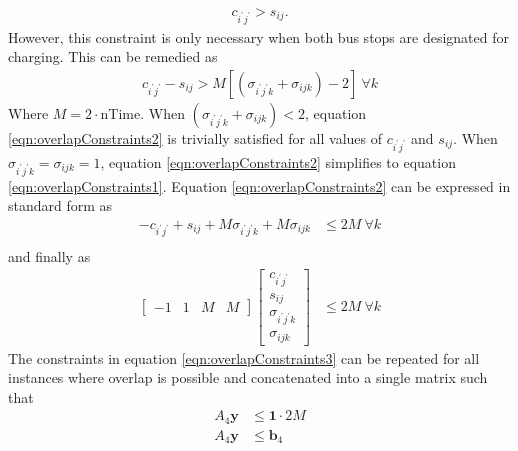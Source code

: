 \begin{align}\label{eqn:overlapConstraints1}
c_{i^{'}j^{'}} > s_{ij}.
\end{align}
However, this constraint is only necessary when both bus stops are designated for charging. This can be remedied as
	\begin{align}\label{eqn:overlapConstraints2}
		c_{i^{'}j^{'}} - s_{ij} > M\left[(\sigma_{i^{'}j^{'}k} + \sigma_{ijk}) - 2\right] \ \forall k
	\end{align}
	Where $M = 2\cdot\text{nTime}$. When $(\sigma_{i^{'}j^{'}k} + \sigma_{ijk}) < 2$, equation \ref{eqn:overlapConstraints2} is trivially satisfied for all values of $c_{i^{'}j^{'}}$ and $s_{ij}$. When $\sigma_{i^{'}j^{'}k} = \sigma_{ijk} = 1$, equation \ref{eqn:overlapConstraints2} simplifies to equation \ref{eqn:overlapConstraints1}. Equation \ref{eqn:overlapConstraints2} can be expressed in standard form as 
	\begin{equation}\label{eqn:overlapConstraints3}\begin{aligned}
		-c_{i^{'}j^{'}} + s_{ij} + M\sigma_{i^{'}j^{'}k} + M\sigma_{ijk} &\le 2M  \ \forall k\\
	\end{aligned}\end{equation}
	and finally as
	\begin{equation}\begin{aligned} 
		\begin{bmatrix} -1 & 1 & M & M\end{bmatrix} \begin{bmatrix}c_{i^{'}j^{'}}\\ s_{ij} \\ \sigma_{i^{'}j^{'}k}\\ \sigma_{ijk} \end{bmatrix} &\le 2M \ \forall k
	\end{aligned} \end{equation}
	The constraints in equation \ref{eqn:overlapConstraints3} can be repeated for all instances where overlap is possible and concatenated into a single matrix such that
	\begin{equation}\begin{aligned} 
		A_4\mathbf{y} & \le \mathbf{1}\cdot 2M \\
		A_4\mathbf{y} & \le \mathbf{b}_4 \\
	\end{aligned} \end{equation} 
